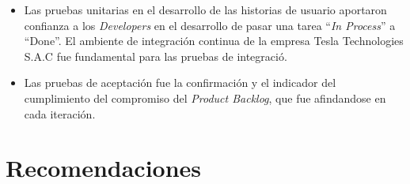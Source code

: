 \begin{spacing}{1.5}
\begin{itemize}
	\item Las pruebas unitarias en el desarrollo de las historias de usuario aportaron confianza a los \textit{Developers} en el desarrollo de pasar una tarea ``\textit{In Process}'' a ``Done''. El ambiente de integraci\'{o}n continua de la empresa Tesla Technologies S.A.C fue fundamental para las pruebas de integraci\'{o}.
	
	\item Las pruebas de aceptaci\'{o}n fue la confirmaci\'{o}n y el indicador del cumplimiento del compromiso del \textit{Product Backlog}, que fue afindandose en cada iteraci\'{o}n.
	
\end{itemize}
\clearpage
\section{Recomendaciones}
\end{spacing}